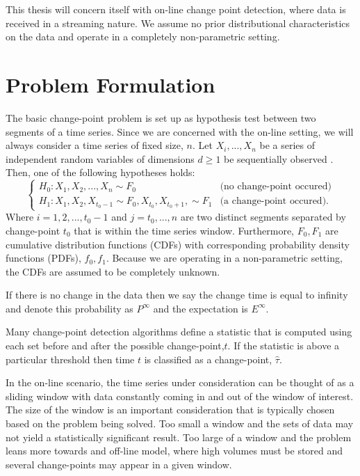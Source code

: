 This thesis will concern itself with on-line change point detection, where data is received in a streaming nature. We assume no prior distributional characteristics on the data and operate in a completely non-parametric setting. 

\section{Problem Formulation}
The basic change-point problem is set up as hypothesis test between two segments of a time series. Since we are concerned with the on-line setting, we will always consider a time series of fixed size, $n$.  Let $X_i,...,X_n$ be a series of independent random variables of dimensions $d \geq 1$ be sequentially observed . Then, one of the following hypotheses holds:
\begin{equation}
  \begin{cases}
    H_0: X_1, X_2, ...,X_n \sim  F_0 & \text{(no change-point occured)} \\
    H_1: X_1,X_2, X_{t_0-1} \sim F_0, X_{t_0}, X_{t_0+1},  \sim F_1 & \text{(a change-point occured)}. 
  \end{cases}
\end{equation}
Where $i=1,2,...,t_0-1$ and $j=t_0,...,n$  are two distinct segments separated by change-point $t_0$ that is within the time series window. Furthermore, $F_0, F_1$ are cumulative distribution functions (CDFs) with corresponding probability density functions (PDFs), $f_0, f_1$. Because we are operating in a non-parametric setting, the CDFs are assumed to be completely unknown. 

If there is no change in the data then we say the change time is equal to infinity and denote this probability as $P^{\infty}$ and the expectation is $E^{\infty}$.

Many change-point detection algorithms define a statistic that is computed using each set before and after the possible change-point,$t$. If the statistic is above a particular threshold then time $t$ is classified as a change-point, $\hat{\tau}$.

In the on-line scenario, the time series under consideration can be thought of as a sliding window with data constantly coming in and out of the window of interest. The size of the window is an important consideration that is typically chosen based on the problem being solved. Too small a window and the sets of data may not yield a statistically significant result. Too large of a window and the problem leans more towards and off-line model, where high volumes must be stored and several change-points may appear in a given window.


